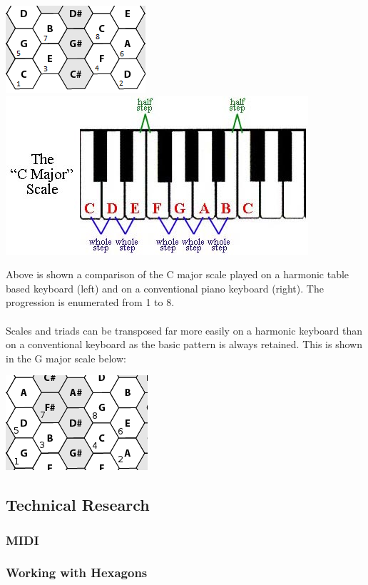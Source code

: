 \documentclass[10pt,a4paper]{article}
\begin{document}
\begin{center}
\includegraphics[scale=0.7]{scale.png}
\includegraphics[scale=1.5]{scale2.jpg}
\end{center}
Above is shown a comparison of the C major scale played on a harmonic table based keyboard (left) and on a conventional piano keyboard (right). The progression is enumerated from 1 to 8.\\
\\
Scales and triads can be transposed far more easily on a harmonic keyboard than on a conventional keyboard as the basic pattern is always retained. This is shown in the G major scale below:
\begin{center}
\includegraphics[scale=0.5]{scale3.png}
\end{center}
\subsection{Technical Research}
\subsubsection{MIDI}

\subsubsection{Working with Hexagons}
\end{document}
